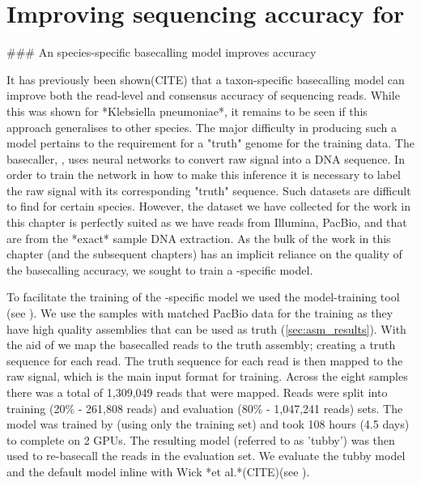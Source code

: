 \chapter{Improving \ont{} sequencing accuracy for \mtb{}}

\begin{markdown}


### An \mtb{} species-specific \ont{} basecalling model improves accuracy

It has previously been shown(CITE) that a taxon-specific basecalling model can improve both the read-level and consensus accuracy of \ont{} sequencing reads. While this was shown for *Klebsiella pneumoniae*, it remains to be seen if this approach generalises to other species. The major difficulty in producing such a model pertains to the requirement for a "truth" genome for the training data. The \ont{} basecaller, \guppy{}, uses neural networks to convert raw signal into a DNA sequence. In order to train the network in how to make this inference it is necessary to label the raw signal with its corresponding "truth" sequence. Such datasets are difficult to find for certain species. However, the dataset we have collected for the work in this chapter is perfectly suited as we have reads from Illumina, PacBio, and \ont{} that are from the *exact* sample DNA extraction. As the bulk of the work in this chapter (and the subsequent chapters) has an implicit reliance on the quality of the \ont{} basecalling accuracy, we sought to train a \mtb{}-specific \guppy{} model.  

To facilitate the training of the \mtb{}-specific model we used the \ont{} model-training tool \taiyaki{} (see ). We use the samples with matched PacBio data for the training as they have high quality assemblies that can be used as truth (\autoref{sec:asm_results}). With the aid of \taiyaki{} we map the basecalled \ont{} reads to the truth assembly; creating a truth sequence for each read. The truth sequence for each read is then mapped to the raw signal, which is the main input format for training. Across the eight samples there was a total of 1,309,049 \ont{} reads that were mapped. Reads were split into training (20\% - 261,808 reads) and evaluation (80\% - 1,047,241 reads) sets. The model was trained by \taiyaki{} (using only the training set) and took 108 hours (4.5 days) to complete on 2 GPUs. The resulting \mtb{} model (referred to as 'tubby') was then used to re-basecall the reads in the evaluation set. We evaluate the tubby model and the default \guppy{} model inline with Wick *et al.*(CITE)(see ).


\end{markdown}
